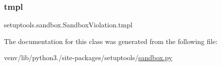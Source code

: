 \subsubsection{\texorpdfstring{tmpl}{tmpl}}
{\footnotesize\ttfamily setuptools.\+sandbox.\+Sandbox\+Violation.\+tmpl\hspace{0.3cm}{\ttfamily [static]}}



The documentation for this class was generated from the following file\+:\begin{DoxyCompactItemize}
\item 
venv/lib/python3./site-\/packages/setuptools/\hyperlink{sandbox_8py}{sandbox.\+py}\end{DoxyCompactItemize}
